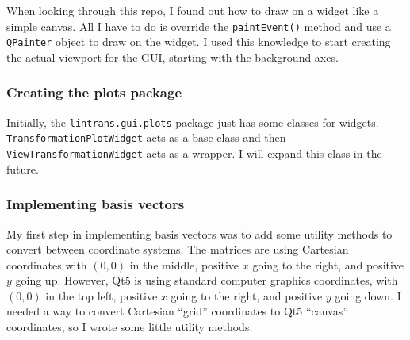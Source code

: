 \documentclass[../development.tex]{subfiles}
\begin{document}
When looking through this repo, I found out how to draw on a widget like a simple canvas. All I have to do is override the \texttt{paintEvent()} method and use a \texttt{QPainter} object to draw on the widget. I used this knowledge to start creating the actual viewport for the GUI, starting with the background axes.

\subsubsection{Creating the plots package\label{development:visualizing-matrices:creating-the-plots-package}}

Initially, the \texttt{lintrans.gui.plots} package just has some classes for widgets. \texttt{TransformationPlotWidget} acts as a base class and then \texttt{ViewTransformationWidget} acts as a wrapper. I will expand this class in the future.



\subsubsection{Implementing basis vectors\label{development:visualizing-matrices:implementing-basis-vectors}}

My first step in implementing basis vectors was to add some utility methods to convert between coordinate systems. The matrices are using Cartesian coordinates with $(0, 0)$ in the middle, positive $x$ going to the right, and positive $y$ going up. However, Qt5 is using standard computer graphics coordinates, with $(0, 0)$ in the top left, positive $x$ going to the right, and positive $y$ going down. I needed a way to convert Cartesian \enquote{grid} coordinates to Qt5 \enquote{canvas} coordinates, so I wrote some little utility methods.
\end{document}
